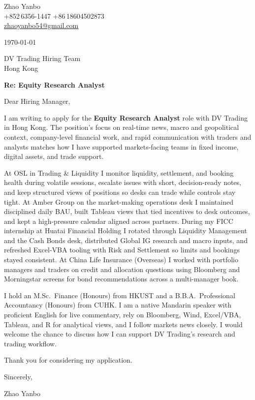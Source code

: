 \documentclass[10pt,a4paper]{article}
\begin{document}
\begin{flushleft}
  Zhao Yanbo\\
  +852\,6356-1447 \;\textbar\; +86\,18604502873\\
  \href{mailto:zhaoyanbo54@gmail.com}{zhaoyanbo54@gmail.com}
\end{flushleft}

\vspace{1em}

\begin{flushright}
  \today
\end{flushright}

\vspace{0.75em}

DV Trading Hiring Team\\
Hong Kong

\vspace{1em}

\textbf{Re: Equity Research Analyst}

\vspace{0.75em}

Dear Hiring Manager,

I am writing to apply for the \textbf{Equity Research Analyst} role with DV Trading in Hong Kong. The position’s focus on real-time news, macro and geopolitical context, company-level financial work, and rapid communication with traders and analysts matches how I have supported markets-facing teams in fixed income, digital assets, and trade support.

At OSL in Trading \& Liquidity I monitor liquidity, settlement, and booking health during volatile sessions, escalate issues with short, decision-ready notes, and keep structured views of positions so desks can trade while controls stay tight. At Amber Group on the market-making operations desk I maintained disciplined daily BAU, built Tableau views that tied incentives to desk outcomes, and kept a high-pressure calendar aligned across partners. During my FICC internship at Huatai Financial Holding I rotated through Liquidity Management and the Cash Bonds desk, distributed Global IG research and macro inputs, and refreshed Excel-VBA tooling with Risk and Settlement so limits and bookings stayed consistent. At China Life Insurance (Overseas) I worked with portfolio managers and traders on credit and allocation questions using Bloomberg and Morningstar screens for bond recommendations across a multi-manager book.

I hold an M.Sc.\ Finance (Honours) from HKUST and a B.B.A.\ Professional Accountancy (Honours) from CUHK. I am a native Mandarin speaker with proficient English for live commentary, rely on Bloomberg, Wind, Excel/VBA, Tableau, and R for analytical views, and I follow markets news closely. I would welcome the chance to discuss how I can support DV Trading's research and trading workflow.

Thank you for considering my application.

\vspace{1em}

Sincerely,

\vspace{2em}

Zhao Yanbo
\end{document}
